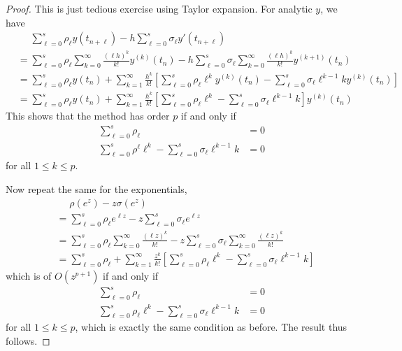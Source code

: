 \documentclass[a4paper]{article}
\begin{document}
\begin{proof}
  This is just tedious exercise using Taylor expansion. For analytic \(y\), we have
  \begin{align*}
    &\phantom{={} } \sum_{\ell = 0}^s \rho_\ell y(t_{n + \ell}) - h \sum_{\ell = 0}^s \sigma_\ell y'(t_{n + \ell}) \\
    &= \sum_{\ell = 0}^s \rho_\ell \sum_{k = 0}^\infty \frac{(\ell h)^k}{k!} y^{(k)}(t_n) - h \sum_{\ell = 0}^s \sigma_\ell \sum_{k = 0}^\infty \frac{(\ell h)^k}{k!} y^{(k + 1)}(t_n) \\
    &= \sum_{\ell = 0}^s \rho_\ell y(t_n) + \sum_{k = 1}^\infty \frac{h^k}{k!} \left[\sum_{\ell = 0}^s \rho_\ell \ell^k y^{(k)}(t_n) - \sum_{\ell = 0}^s \sigma_\ell \ell^{k - 1} ky^{(k)}(t_n) \right] \\
    &= \sum_{\ell = 0}^s \rho_\ell y(t_n) + \sum_{k = 1}^\infty \frac{h^k}{k!} \left[ \sum_{\ell = 0}^s \rho_\ell \ell^k - \sum_{\ell = 0}^s \sigma_\ell \ell^{k - 1} k \right] y^{(k)}(t_n)
  \end{align*}
  This shows that the method has order \(p\) if and only if
  \begin{align*}
    \sum_{\ell = 0}^s \rho_\ell &= 0 \\
    \sum_{\ell = 0}^s \rho^\ell \ell^k - \sum_{\ell = 0}^s \sigma_\ell \ell^{k - 1}k &= 0
  \end{align*}
  for all \(1 \leq k \leq p\).

  Now repeat the same for the exponentials,
  \begin{align*}
    &\phantom{={} } \rho(e^z) - z\sigma(e^z) \\
    &= \sum_{\ell = 0}^s \rho_\ell e^{\ell z} - z \sum_{\ell = 0}^s \sigma_\ell e^{\ell z} \\
    &= \sum_{\ell = 0}^s \rho_\ell \sum_{k = 0}^\infty \frac{(\ell z)^k}{k!} - z\sum_{\ell = 0}^s \sigma_\ell \sum_{k = 0}^\infty \frac{(\ell z)^k}{k!} \\
    &= \sum_{\ell = 0}^s \rho_\ell + \sum_{k = 1}^\infty \frac{z^k}{k!} \left[ \sum_{\ell = 0}^s \rho_\ell \ell^k - \sum_{\ell = 0}^s \sigma_\ell \ell^{k - 1}k \right]
  \end{align*}
  which is of \(O(z^{p + 1})\) if and only if
  \begin{align*}
    \sum_{\ell = 0}^s \rho_\ell &= 0 \\
    \sum_{\ell = 0}^s \rho_\ell \ell^k - \sum_{\ell = 0}^s \sigma_\ell \ell^{k - 1}k &= 0
  \end{align*}
  for all \(1 \leq k \leq p\), which is exactly the same condition as before. The result thus follows.
\end{proof}
\end{document}
